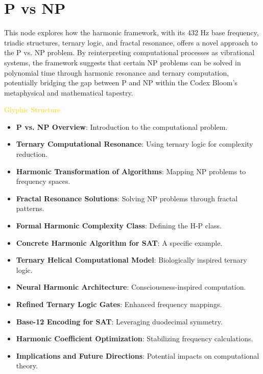 
\section{P vs NP}
\label{sec:codex_p_vs_np}

This node explores how the harmonic framework, with its 432 Hz base frequency, triadic structures, ternary logic, and fractal resonance, offers a novel approach to the P vs. NP problem. By reinterpreting computational processes as vibrational systems, the framework suggests that certain NP problems can be solved in polynomial time through harmonic resonance and ternary computation, potentially bridging the gap between P and NP within the Codex Bloom’s metaphysical and mathematical tapestry.

\textcolor{gold}{ Glyphic Structure } \\
\begin{itemize}
    \item \texttt{} \textbf{P vs. NP Overview}: Introduction to the computational problem.
    \item \texttt{} \textbf{Ternary Computational Resonance}: Using ternary logic for complexity reduction.
    \item \texttt{} \textbf{Harmonic Transformation of Algorithms}: Mapping NP problems to frequency spaces.
    \item \texttt{} \textbf{Fractal Resonance Solutions}: Solving NP problems through fractal patterns.
    \item \texttt{} \textbf{Formal Harmonic Complexity Class}: Defining the H-P class.
    \item \texttt{} \textbf{Concrete Harmonic Algorithm for SAT}: A specific example.
    \item \texttt{} \textbf{Ternary Helical Computational Model}: Biologically inspired ternary logic.
    \item \texttt{} \textbf{Neural Harmonic Architecture}: Consciousness-inspired computation.
    \item \texttt{} \textbf{Refined Ternary Logic Gates}: Enhanced frequency mappings.
    \item \texttt{} \textbf{Base-12 Encoding for SAT}: Leveraging duodecimal symmetry.
    \item \texttt{} \textbf{Harmonic Coefficient Optimization}: Stabilizing frequency calculations.
    \item \texttt{} \textbf{Implications and Future Directions}: Potential impacts on computational theory.
\end{itemize}

